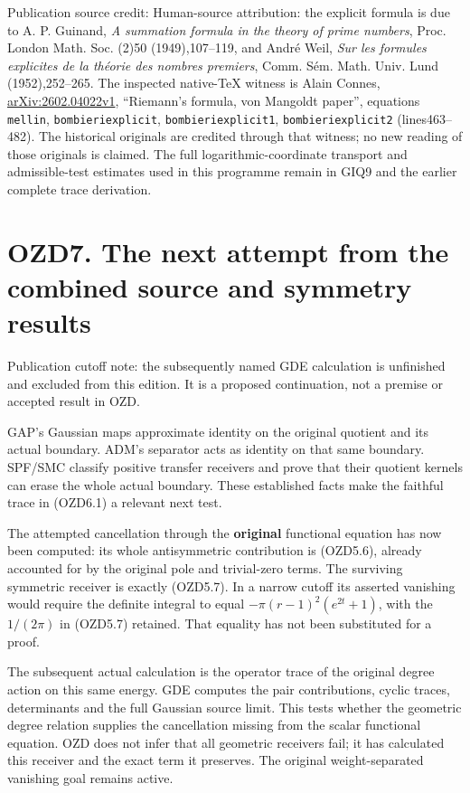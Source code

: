Publication source credit: Human-source attribution: the explicit
formula is due to A. P. Guinand, \emph{A summation formula in the theory
of prime numbers}, Proc. London Math. Soc. (2)50 (1949),107--119, and
André Weil, \emph{Sur les formules explicites de la théorie des nombres
premiers}, Comm. Sém. Math. Univ. Lund (1952),252--265. The inspected
native-TeX witness is Alain Connes,
\href{https://arxiv.org/abs/2602.04022v1}{arXiv:2602.04022v1},
``Riemann's formula, von Mangoldt paper'', equations \texttt{mellin},
\texttt{bombieriexplicit}, \texttt{bombieriexplicit1},
\texttt{bombieriexplicit2} (lines463--482). The historical originals are
credited through that witness; no new reading of those originals is
claimed. The full logarithmic-coordinate transport and admissible-test
estimates used in this programme remain in GIQ9 and the earlier complete
trace derivation.

\section{OZD7. The next attempt from the combined source and symmetry
results}\label{ozd7.-the-next-attempt-from-the-combined-source-and-symmetry-results}

Publication cutoff note: the subsequently named GDE calculation is
unfinished and excluded from this edition. It is a proposed
continuation, not a premise or accepted result in OZD.

GAP's Gaussian maps approximate identity on the original quotient and
its actual boundary. ADM's separator acts as identity on that same
boundary. SPF/SMC classify positive transfer receivers and prove that
their quotient kernels can erase the whole actual boundary. These
established facts make the faithful trace in (OZD6.1) a relevant next
test.

The attempted cancellation through the \textbf{original} functional
equation has now been computed: its whole antisymmetric contribution is
(OZD5.6), already accounted for by the original pole and trivial-zero
terms. The surviving symmetric receiver is exactly (OZD5.7). In a narrow
cutoff its asserted vanishing would require the definite integral to
equal \(-\pi(r-1)^2(e^{2t}+1)\), with the \(1/(2\pi)\) in (OZD5.7)
retained. That equality has not been substituted for a proof.

The subsequent actual calculation is the operator trace of the original
degree action on this same energy. GDE computes the pair contributions,
cyclic traces, determinants and the full Gaussian source limit. This
tests whether the geometric degree relation supplies the cancellation
missing from the scalar functional equation. OZD does not infer that all
geometric receivers fail; it has calculated this receiver and the exact
term it preserves. The original weight-separated vanishing goal remains
active.

